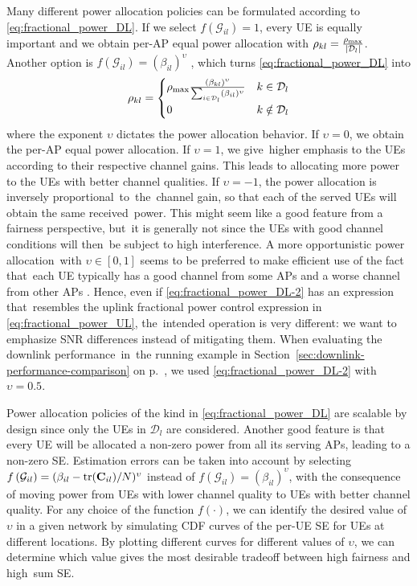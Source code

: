 \enlargethispage{-\baselineskip}

Many different power allocation policies can be formulated according to \eqref{eq:fractional_power_DL}. If we select $f\left(\mathcal{G}_{il}\right)=1$, every UE is equally important and we obtain per-AP equal power allocation with $\rho_{kl}=\frac{\rho_{\textrm{max}}}{|\mathcal{D}_l|}$.
Another option is $f\left(\mathcal{G}_{il}\right) = (\beta_{il})^{\upsilon}$ \cite{Interdonato2019a}, which turns \eqref{eq:fractional_power_DL} into
\begin{equation} \label{eq:fractional_power_DL-2}
\rho_{kl} = \begin{cases} \rho_{\textrm{max}} \frac{ (\beta_{kl})^{\upsilon}}{\sum_{i \in \mathcal{D}_l} (\beta_{il})^{\upsilon}} &  k \in \mathcal{D}_l\\
0 &  k \notin \mathcal{D}_l
\end{cases}
\end{equation}
where the exponent $\upsilon$ dictates the power allocation behavior. If $\upsilon=0$, we obtain the per-AP equal power allocation. If $\upsilon=1$, we give~higher emphasis to the UEs according to their respective channel gains. This leads to allocating more power to the UEs with better channel qualities. If $\upsilon=-1$, the power allocation is inversely proportional~to~the~channel gain, so that each of the served UEs will obtain the same received~power.
This might seem like a good feature from a fairness perspective, but~it is generally not since the UEs with good channel conditions will then~be subject to high interference.
A more opportunistic power allocation~with $\upsilon \in [0,1]$ seems to be preferred to make efficient use of the fact that~each UE typically has a good channel from some APs and a worse channel from other APs \cite{Interdonato2019a}. 
Hence, even if  \eqref{eq:fractional_power_DL-2} has an expression that~resembles the uplink fractional power control expression in \eqref{eq:fractional_power_UL}, the~intended operation is very different: we want to emphasize SNR differences instead of mitigating them.
When evaluating the downlink performance~in~the running example in Section~\ref{sec:downlink-performance-comparison} on p.~\pageref{sec:downlink-performance-comparison}, we used \eqref{eq:fractional_power_DL-2} with $\upsilon = 0.5$.

Power allocation policies of the kind in \eqref{eq:fractional_power_DL} are scalable by design since only the UEs in $\mathcal{D}_l$ are considered. Another good feature is that every UE will be allocated a non-zero power from all its serving APs, leading to a non-zero SE. Estimation errors can be taken into account by selecting $f\left(\mathcal{G}_{il}\right) = (\beta_{il}-\mathrm{tr}(\mathbf{C}_{il})/N)^{\upsilon}$ instead of  $f\left(\mathcal{G}_{il}\right) = (\beta_{il})^{\upsilon}$, with the consequence of moving power from UEs with lower channel quality to UEs with better channel quality.
For any choice of the function $f(\cdot)$, we can identify the desired value of $\upsilon$ in a given network by simulating CDF curves of the per-UE SE for UEs at different locations. By plotting different curves for different values of $\upsilon$, we can determine which value gives the most desirable tradeoff between high fairness and high~sum SE.


